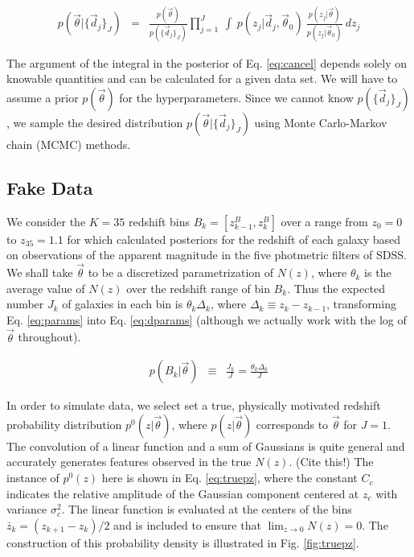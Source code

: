 \documentclass[12pt, onecolumn]{emulateapj}
\begin{document}
\begin{eqnarray}
\label{eq:cancel}
p(\vec{\theta}|\{\vec{d}_{j}\}_{J}) &=& \frac{p(\vec{\theta})}{p(\{\vec{d}_{j}\}_{J})}\prod_{j=1}^{J}\ \int\ p(z_{j}|\vec{d}_{j},\vec{\theta}_{0})\ \frac{p(z_{j}|\vec{\theta})}{p(z_{j}|\vec{\theta}_{0})}\ dz_{j}
\end{eqnarray}

The argument of the integral in the posterior of Eq. \ref{eq:cancel} depends solely on knowable quantities and can be calculated for a given data set.  We will have to assume a prior $p(\vec{\theta})$ for the hyperparameters.   Since we cannot know $p(\{\vec{d}_{j}\}_{J})$, we sample the desired distribution $p(\vec{\theta}|\{\vec{d}_{j}\}_{J})$ using Monte Carlo-Markov chain (MCMC) methods.  

\subsection{Fake Data}
\label{sec:fake}

We consider the $K=35$ redshift bins $B_{k}=[z^{B}_{k-1},z^{B}_{k}]$ over a range from $z_{0}=0$ to $z_{35}=1.1$ for which \citet{she11} calculated posteriors for the redshift of each galaxy based on observations of the apparent magnitude in the five photmetric filters of SDSS.  We shall take $\vec{\theta}$ to be a discretized parametrization of $N(z)$, where $\theta_{k}$ is the average value of $N(z)$ over the redshift range of bin $B_{k}$.   Thus the expected number $J_{k}$ of galaxies in each bin is $\theta_{k}\Delta_{k}$, where $\Delta_{k}\equiv z_{k}-z_{k-1}$, transforming Eq. \ref{eq:params} into Eq. \ref{eq:dparams} (although we actually work with the log of $\vec{\theta}$ throughout).  

\begin{eqnarray}
\label{eq:dparams}
p(B_{k}|\vec{\theta}) &\equiv& \frac{J_{k}}{J} = \frac{\theta_{k}\Delta_{k}}{J}
\end{eqnarray}

In order to simulate data, we select set a true, physically motivated redshift probability distribution $p^{0}(z|\vec{\theta})$, where $p(z|\vec{\theta})$ corresponds to $\vec{\theta}$ for $J=1$.  The convolution of a linear function and a sum of Gaussians is quite general and accurately generates features observed in the true $N(z)$.  (Cite this!)  The instance of $p^{0}(z)$ here is shown in Eq. \ref{eq:truepz}, where the constant $C_{c}$ indicates the relative amplitude of the Gaussian component centered at $z_{c}$ with variance $\sigma_{c}^{2}$.  The linear function is evaluated at the centers of the bins $\bar{z}_{k}=(z_{k+1}-z_{k})/2$ and is included to ensure that $\lim_{z\to0}N(z)=0$.  The construction of this probability density is illustrated in Fig. \ref{fig:truepz}.  
\end{document}
